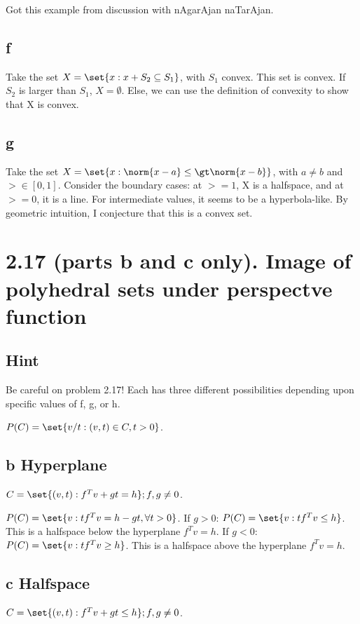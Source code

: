 \documentclass{article}
\begin{document}
\begin{ack}
Got this example from discussion with nAgarAjan naTarAjan. 
\end{ack}

\subsection{f}
Take the set $X = \set{x : x + S_2 \subseteq S_1}$, with $S_1$ convex. This set is convex. If $S_2$ is larger than $S_1$, $X = \emptyset$. Else, we can use the definition of convexity to show that X is convex.

\subsection{g}
Take the set $X = \set{x: \norm{x - a} \leq \gt \norm{x - b}}$, with $a\neq b$ and $\gt \in [0, 1]$. Consider the boundary cases: at $\gt = 1$, X is a halfspace, and at $\gt = 0$, it is a line. For intermediate values, it seems to be a hyperbola-like. By geometric intuition, I conjecture that this is a convex set.

\section{2.17 (parts b and c only). Image of polyhedral sets under perspectve function}
\subsection{Hint}
Be careful on problem 2.17! Each has three different possibilities depending upon specific values of f, g, or h.

$P(C) = \set{v/t:(v, t) \in C, t>0}$.

\subsection{b Hyperplane}
$C = \set{(v, t): f^{T}v + gt  = h}; f, g \neq 0$.

$P(C) = \set{v: tf^{T}v = h - gt, \forall t>0}$. If $g>0$: $P(C) = \set{v: tf^{T}v \leq h}$. This is a halfspace below the hyperplane $f^{T}v = h$. If $g<0$: $P(C) = \set{v: tf^{T}v \geq h}$. This is a halfspace above the hyperplane $f^{T}v = h$.

\subsection{c Halfspace}
$C = \set{(v, t): f^{T}v + gt \leq h}; f, g \neq 0$.
\end{document}
